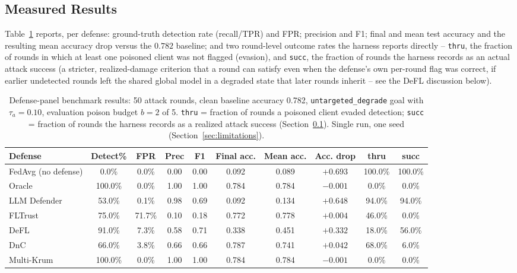 \documentclass[conference]{IEEEtran}
\begin{document}
\subsection{Measured Results}
\label{sec:measured-results}
Table~\ref{tab:results} reports, per defense: ground-truth detection rate (recall/TPR) and FPR; precision and F1; final and mean test accuracy and the resulting mean accuracy drop versus the $0.782$ baseline; and two round-level outcome rates the harness reports directly -- \texttt{thru}, the fraction of rounds in which at least one poisoned client was not flagged (evasion), and \texttt{succ}, the fraction of rounds the harness records as an actual attack success (a stricter, realized-damage criterion that a round can satisfy even when the defense's own per-round flag was correct, if earlier undetected rounds left the shared global model in a degraded state that later rounds inherit -- see the DeFL discussion below).

\begin{table}[t]
\caption{Defense-panel benchmark results: 50 attack rounds, clean baseline accuracy 0.782, \texttt{untargeted\_degrade} goal with $\tau_a=0.10$, evaluation poison budget $b=2$ of 5. \texttt{thru} = fraction of rounds a poisoned client evaded detection; \texttt{succ} = fraction of rounds the harness records as a realized attack success (Section~\ref{sec:measured-results}). Single run, one seed (Section~\ref{sec:limitations}).}
\label{tab:results}
\centering
\small
\begin{tabular}{@{}lccccccccc@{}}
\toprule
\textbf{Defense} & \textbf{Detect\%} & \textbf{FPR} & \textbf{Prec} & \textbf{F1} & \textbf{Final acc.} & \textbf{Mean acc.} & \textbf{Acc. drop} & \textbf{thru} & \textbf{succ} \\
\midrule
FedAvg (no defense) & 0.0\% & 0.0\% & 0.00 & 0.00 & 0.092 & 0.089 & $+0.693$ & 100.0\% & 100.0\% \\
Oracle & 100.0\% & 0.0\% & 1.00 & 1.00 & 0.784 & 0.784 & $-0.001$ & 0.0\% & 0.0\% \\
LLM Defender & 53.0\% & 0.1\% & 0.98 & 0.69 & 0.092 & 0.134 & $+0.648$ & 94.0\% & 94.0\% \\
FLTrust & 75.0\% & 71.7\% & 0.10 & 0.18 & 0.772 & 0.778 & $+0.004$ & 46.0\% & 0.0\% \\
DeFL & 91.0\% & 7.3\% & 0.58 & 0.71 & 0.338 & 0.451 & $+0.332$ & 18.0\% & 56.0\% \\
DnC & 66.0\% & 3.8\% & 0.66 & 0.66 & 0.787 & 0.741 & $+0.042$ & 68.0\% & 6.0\% \\
Multi-Krum & 100.0\% & 0.0\% & 1.00 & 1.00 & 0.784 & 0.784 & $-0.001$ & 0.0\% & 0.0\% \\
\bottomrule
\end{tabular}
\end{table}
\end{document}
